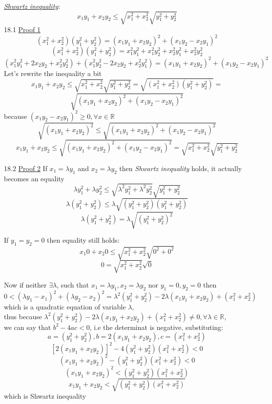 \documentclass[a4paper, 11pt]{article}
\begin{document}
\hrulefill

\underline{\emph{Shwartz inequality}}:
$$x_1y_1 + x_2y_2 \leq \sqrt{x_1^2 + x_2^2}\sqrt{y_1^2 + y_2^2}$$
18.1 \underline{Proof 1}
$$(x_1^2 + x_2^2)(y_1^2 + y_2^2) = (x_1y_1 + x_2y_2)^2 + (x_1y_2 - x_2y_1)^2$$
$$(x_1^2 + x_2^2)(y_1^2 + y_2^2) = x_1^2y_1^2 + x_1^2y_2^2 + x_2^2y_1^2 + x_2^2y_2^2$$
$$(x_1^2y_1^2 + 2x_2y_2 + x_2^2y_2^2) + (x_1^2y_2^2 - 2x_2y_2 + x_2^2y_1^2) = (x_1y_1 + x_2y_2)^2 + (x_1y_2 - x_2y_1)^2$$
Let's rewrite the inequality a bit
$$x_1y_1 + x_2y_2 \leq \sqrt{x_1^2 + x_2^2}\sqrt{y_1^2 + y_2^2} = \sqrt{(x_1^2 + x_2^2)(y_1^2 + y_2^2)} = $$
$$\sqrt{(x_1y_1 + x_2y_2)^2 + (x_1y_2 - x_2y_1)^2}$$
because $(x_1y_2 - x_2y_1)^2 \geq 0, \forall x \in \mathbb{R}$ 
$$\sqrt{(x_1y_1 + x_2y_2)^2} \leq \sqrt{(x_1y_1 + x_2y_2)^2 + (x_1y_2 - x_2y_1)^2}$$
$$x_1y_1 + x_2y_2 \leq \sqrt{(x_1y_1 + x_2y_2)^2 + (x_1y_2 - x_2y_1)^2} = \sqrt{x_1^2 + x_2^2}\sqrt{y_1^2 + y_2^2}$$

\hrulefill

18.2 \underline{Proof 2}
If $x_1 = \lambda y_1$ and $x_2 = \lambda y_2$ then \emph{Shwartz inequality} holds, it actually becomes an equality
$$\lambda y_1^2 + \lambda y_2^2 \leq \sqrt{\lambda^2 y_1^2 + \lambda^2 y_2^2}\sqrt{y_1^2 + y_2^2}$$
$$\lambda (y_1^2 + y_2^2) \leq \lambda \sqrt{(y_1^2 + y_2^2)(y_1^2 + y_2^2)}$$
$$\lambda (y_1^2 + y_2^2) = \lambda \sqrt{(y_1^2 + y_2^2)^2}$$

If $y_1 = y_2 = 0$ then equality still holds:
$$x_1 0 + x_2 0 \leq \sqrt{x_1^2 + x_2^2}\sqrt{0^2 + 0^2}$$
$$0 = \sqrt{x_1^2 + x_2^2} \sqrt{0}$$

Now if neither $\exists \lambda$, such that $x_1 = \lambda y_1, x_2 = \lambda y_2$ nor $y_1 = 0, y_2 = 0$ then
$$0 < (\lambda y_1 - x_1)^2 + (\lambda y_2 - x_2)^2 = \lambda^2(y_1^2 + y_2^2) - 2\lambda(x_1y_1 + x_2y_2) + (x_1^2 + x_2^2)$$
which is a quadratic equation of variable $\lambda$,\\
thus because $\lambda^2(y_1^2 + y_2^2) - 2\lambda(x_1y_1 + x_2y_2) + (x_1^2 + x_2^2) \ne 0, \forall \lambda \in \mathbb{R}$,\\
we can say that $b^2 - 4ac < 0$, i.e the determinat is negative, substituting:
$$a = (y_1^2 + y_2^2), b = 2(x_1y_1 + x_2y_2), c = (x_1^2 + x_2^2)$$
$$[2(x_1y_1 + x_2y_2)]^2 - 4(y_1^2 + y_2^2)(x_1^2 + x_2^2) < 0$$
$$(x_1y_1 + x_2y_2)^2 - (y_1^2 + y_2^2)(x_1^2 + x_2^2) < 0$$
$$(x_1y_1 + x_2y_2)^2 < (y_1^2 + y_2^2)(x_1^2 + x_2^2)$$
$$x_1y_1 + x_2y_2 < \sqrt{(y_1^2 + y_2^2)(x_1^2 + x_2^2)}$$
which is Shwartz inequality



\end{document}
